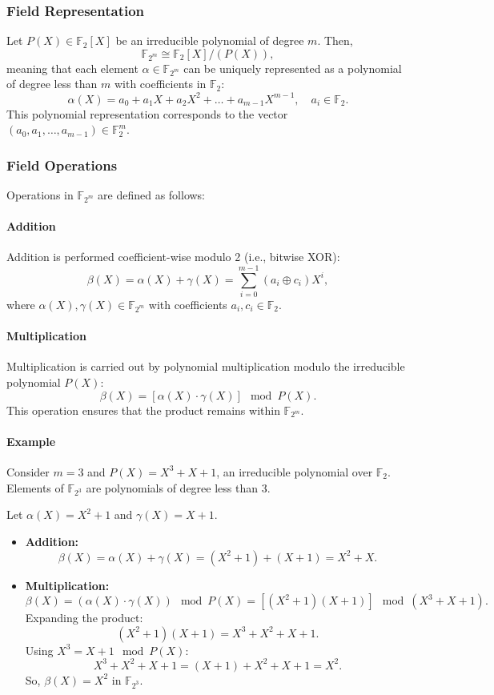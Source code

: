 \documentclass{article}
\theoremstyle{plain}
\theoremstyle{definition}
\theoremstyle{remark}
\theoremstyle{problem}
\begin{document}
\subsubsection{Field Representation}

Let $P(X) \in \mathbb{F}_2[X]$ be an irreducible polynomial of degree $m$. Then,
\[
\mathbb{F}_{2^m} \cong \mathbb{F}_2[X]/(P(X)),
\]
meaning that each element $\alpha \in \mathbb{F}_{2^m}$ can be uniquely represented as a polynomial of degree less than $m$ with coefficients in $\mathbb{F}_2$:
\[
\alpha(X) = a_0 + a_1 X + a_2 X^2 + \dots + a_{m-1} X^{m-1}, \quad a_i \in \mathbb{F}_2.
\]
This polynomial representation corresponds to the vector $(a_0, a_1, \dots, a_{m-1}) \in \mathbb{F}_2^m$.

\subsubsection{Field Operations}

Operations in $\mathbb{F}_{2^m}$ are defined as follows:

\paragraph{Addition}
Addition is performed coefficient-wise modulo 2 (i.e., bitwise XOR):
\[
\beta(X) = \alpha(X) + \gamma(X) = \sum_{i=0}^{m-1} (a_i \oplus c_i) X^i,
\]
where $\alpha(X), \gamma(X) \in \mathbb{F}_{2^m}$ with coefficients $a_i, c_i \in \mathbb{F}_2$.

\paragraph{Multiplication}
Multiplication is carried out by polynomial multiplication modulo the irreducible polynomial $P(X)$:
\[
\beta(X) = [\alpha(X) \cdot \gamma(X)] \mod P(X).
\]
This operation ensures that the product remains within $\mathbb{F}_{2^m}$.

\paragraph{Example}
Consider $m = 3$ and $P(X) = X^3 + X + 1$, an irreducible polynomial over $\mathbb{F}_2$. Elements of $\mathbb{F}_{2^3}$ are polynomials of degree less than 3.

Let $\alpha(X) = X^2 + 1$ and $\gamma(X) = X + 1$.

\begin{itemize}
    \item \textbf{Addition:}
    \[
    \beta(X) = \alpha(X) + \gamma(X) = (X^2 + 1) + (X + 1) = X^2 + X.
    \]

    \item \textbf{Multiplication:}
    \[
    \beta(X) = (\alpha(X) \cdot \gamma(X)) \mod P(X) = [(X^2 + 1)(X + 1)] \mod (X^3 + X + 1).
    \]
    Expanding the product:
    \[
    (X^2 + 1)(X + 1) = X^3 + X^2 + X + 1.
    \]
    Using $X^3 = X + 1 \mod P(X)$:
    \[
    X^3 + X^2 + X + 1 = (X + 1) + X^2 + X + 1 = X^2.
    \]
    So, $\beta(X) = X^2$ in $\mathbb{F}_{2^3}$.
\end{itemize}
\end{document}
